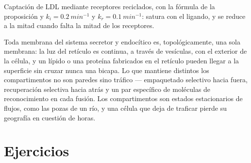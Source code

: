 \begin{omfigure}

{\small Captación de LDL mediante receptores reciclados, con la fórmula
de la proposición y $k_{i} = \qty{0.2}{min^{-1}}$ y $k_{r} =
\qty{0.1}{min^{-1}}$: satura con el ligando, y se reduce a la mitad
cuando falta la mitad de los receptores.}
\end{omfigure}

\begin{remark}\label{rem:b3:membrane-traffic:one-membrane}
Toda membrana del sistema secretor y endocítico es, topológicamente, una
sola membrana: la luz del retículo es continua, a través de vesículas,
con el exterior de la célula, y un lípido o una proteína fabricados en el
retículo pueden llegar a la superficie sin cruzar nunca una bicapa. Lo
que mantiene distintos los compartimentos no son paredes sino tráfico ---
empaquetado selectivo hacia fuera, recuperación selectiva hacia atrás y
un par específico de moléculas de reconocimiento en cada fusión. Los
compartimentos son estados estacionarios de flujos, como las pozas de un
río, y una célula que deja de traficar pierde su geografía en cuestión de
horas.
\end{remark}

\section{Ejercicios}

